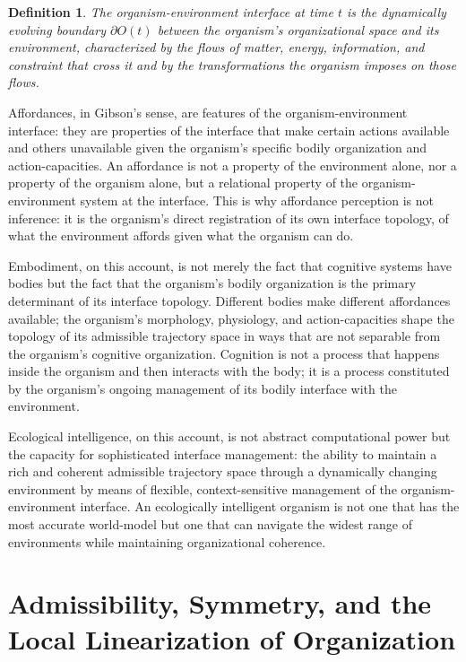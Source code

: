 \documentclass[12pt,a4paper]{report}
\theoremstyle{flyxion}
\newtheorem{definition}[theorem]{Definition}
\begin{document}
\begin{definition}
The \emph{organism-environment interface} at time $t$ is the dynamically evolving boundary $\partial O(t)$ between the organism's organizational space and its environment, characterized by the flows of matter, energy, information, and constraint that cross it and by the transformations the organism imposes on those flows.
\end{definition}

Affordances, in Gibson's sense, are features of the organism-environment interface: they are properties of the interface that make certain actions available and others unavailable given the organism's specific bodily organization and action-capacities. An affordance is not a property of the environment alone, nor a property of the organism alone, but a relational property of the organism-environment system at the interface. This is why affordance perception is not inference: it is the organism's direct registration of its own interface topology, of what the environment affords given what the organism can do.

Embodiment, on this account, is not merely the fact that cognitive systems have bodies but the fact that the organism's bodily organization is the primary determinant of its interface topology. Different bodies make different affordances available; the organism's morphology, physiology, and action-capacities shape the topology of its admissible trajectory space in ways that are not separable from the organism's cognitive organization. Cognition is not a process that happens inside the organism and then interacts with the body; it is a process constituted by the organism's ongoing management of its bodily interface with the environment.

Ecological intelligence, on this account, is not abstract computational power but the capacity for sophisticated interface management: the ability to maintain a rich and coherent admissible trajectory space through a dynamically changing environment by means of flexible, context-sensitive management of the organism-environment interface. An ecologically intelligent organism is not one that has the most accurate world-model but one that can navigate the widest range of environments while maintaining organizational coherence.

\section{Admissibility, Symmetry, and the Local Linearization of Organization}
\end{document}
